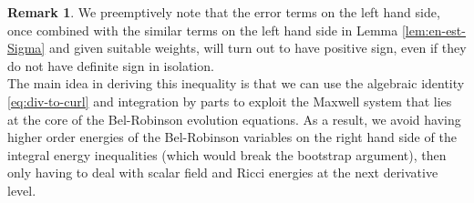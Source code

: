 \documentclass[11pt,leqno,textwidth=10cm]{amsart}
\numberwithin{equation}{section}
\theoremstyle{definition}
\newtheorem{remark}[definition]{Remark}
\theoremstyle{plain}
\newcommand{\1}{\mathbbm{1}}
\newcommand{\change}[1]{\color{black}#1\color{black}}
\begin{document}
\begin{remark}
We preemptively note that the error terms on the left hand side, once combined with the similar terms on the left hand side in Lemma \ref{lem:en-est-Sigma} and given suitable weights, will turn out to have positive sign, even if they do not have definite sign in isolation.\\

The main idea in deriving this inequality is that we can use the algebraic identity \eqref{eq:div-to-curl} and integration by parts to exploit the Maxwell system that lies at the core of the Bel-Robinson evolution equations. As a result, we avoid having higher order energies of the Bel-Robinson variables on the right hand side of the integral energy inequalities (which would break the bootstrap argument), then only having to deal with scalar field and Ricci energies at the next derivative \change{level. }%
\end{remark}
\end{document}

